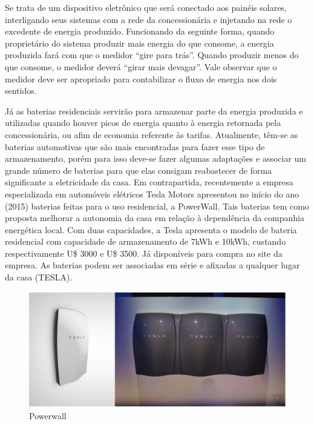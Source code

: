 	Se trata de um dispositivo eletrônico que será conectado aos painéis solares, interligando seus sistemas com a rede da concessionária e injetando na rede o excedente de energia produzido. Funcionando da seguinte forma, quando proprietário do sistema produzir mais energia do que consome, a energia produzida fará com que o medidor “gire para trás”. Quando produzir menos do que consome, o medidor deverá “girar mais devagar”. Vale observar que o medidor deve ser apropriado para contabilizar o fluxo de energia nos dois sentidos.

	Já as baterias residenciais servirão para armazenar parte da energia produzida e utilizadas quando houver picos de energia quanto à energia retornada pela concessionária, ou afim de economia referente às tarifas. Atualmente, têm-se as baterias automotivas que são mais encontradas para fazer esse tipo de armazenamento, porém para isso deve-se fazer algumas adaptações e associar um grande número de baterias para que elas consigam reabastecer de forma significante a eletricidade da casa. Em contrapartida, recentemente a empresa especializada em automóveis elétricos Tesla Motors apresentou no início do ano (2015) baterias feitas para o uso residencial, a PowerWall. Tais baterias tem como proposta melhorar a autonomia da casa em relação à dependência da companhia energética local. Com duas capacidades, a Tesla apresenta o modelo de bateria residencial com capacidade de armazenamento de 7kWh e 10kWh, custando respectivamente U\$ 3000 e U\$ 3500. Já disponíveis para compra no site da empresa. As baterias podem ser associadas em série e afixadas a qualquer lugar da casa (TESLA).

\begin{figure}[H]
  \begin{center}
	\includegraphics[keepaspectratio,scale=1]{figuras/powerwall.eps}
	\caption{Powerwall}
  \end{center}
\end{figure}

